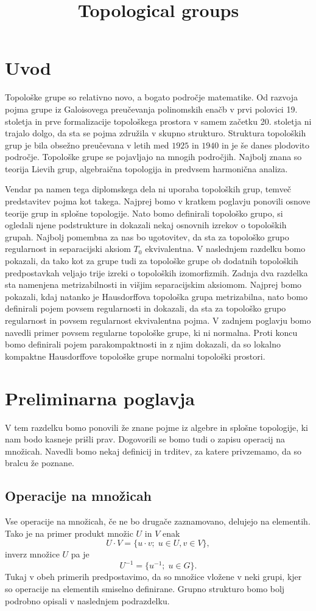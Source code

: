 \documentclass[mat1]{fmfdelo}
\title{Topological groups}
\begin{document}
\section{Uvod}
Topološke grupe so relativno novo, a bogato področje matematike. Od razvoja pojma grupe iz Galoisovega preučevanja polinomskih enačb v prvi polovici 19. stoletja in prve formalizacije topološkega prostora v samem začetku 20. stoletja ni trajalo dolgo, da sta se pojma združila v skupno strukturo. Struktura topoloških grup je bila obsežno preučevana v letih med $1925$ in $1940$ in je še danes plodovito področje. Topološke grupe se pojavljajo na mnogih področjih. Najbolj znana so teorija Lievih grup, algebraična topologija in predvsem harmonična analiza.

Vendar pa namen tega diplomskega dela ni uporaba topoloških grup, temveč predstavitev pojma kot takega. Najprej bomo v kratkem poglavju ponovili osnove teorije grup in splošne topologije. Nato bomo definirali topološko grupo, si ogledali njene podstrukture in dokazali nekaj osnovnih izrekov o topoloških grupah. Najbolj pomembna za nas bo ugotovitev, da sta za topološko grupo regularnost in separacijski aksiom $T_0$ ekvivalentna. V naslednjem razdelku bomo pokazali, da tako kot za grupe tudi za topološke grupe ob dodatnih topoloških predpostavkah veljajo trije izreki o topoloških izomorfizmih. Zadnja dva razdelka sta namenjena metrizabilnosti in višjim separacijskim aksiomom. Najprej bomo pokazali, kdaj natanko je Hausdorffova topološka grupa metrizabilna, nato bomo definirali pojem povsem regularnosti in dokazali, da sta za topološko grupo regularnost in povsem regularnost ekvivalentna pojma. V zadnjem poglavju bomo navedli primer povsem regularne topološke grupe, ki ni normalna. Proti koncu bomo definirali pojem parakompaktnosti in z njim dokazali, da so lokalno kompaktne Hausdorffove topološke grupe normalni topološki prostori.

\section{Preliminarna poglavja}
V tem razdelku bomo ponovili že znane pojme iz algebre in splošne topologije, ki nam bodo kasneje prišli prav. Dogovorili se bomo tudi o zapisu operacij na množicah. Navedli bomo nekaj definicij in trditev, za katere privzemamo, da so bralcu že poznane.

\subsection{Operacije na množicah}\label{sec:opnamnozicah}
Vse operacije na množicah, če ne bo drugače za\-zna\-mo\-va\-no, delujejo na elementih. Tako je na primer produkt množic $U$ in $V$ enak \[U \cdot V = \lbrace u \cdot v;\; u \in U, v \in V \rbrace, \] inverz množice $U$ pa je \[ U^{-1} = \lbrace u^{-1} ;\; u \in G \rbrace. \] Tukaj v obeh primerih predpostavimo, da so množice vložene v neki grupi, kjer so operacije na elementih smiselno definirane. Grupno strukturo bomo bolj podrobno opisali v naslednjem podrazdelku.
\end{document}
